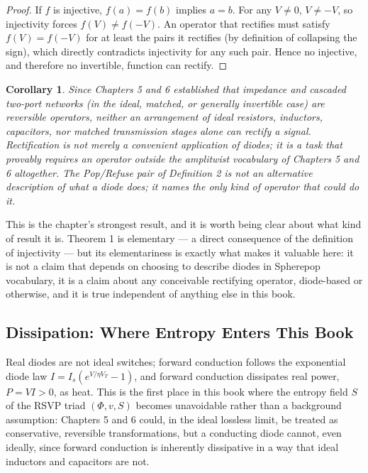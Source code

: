 \documentclass[12pt]{article}
\newtheorem{corollary}{Corollary}
\begin{document}
\begin{proof}
If $f$ is injective, $f(a) = f(b)$ implies $a = b$. For any $V \neq 0$, $V \neq -V$, so injectivity forces $f(V) \neq f(-V)$. An operator that rectifies must satisfy $f(V) = f(-V)$ for at least the pairs it rectifies (by definition of collapsing the sign), which directly contradicts injectivity for any such pair. Hence no injective, and therefore no invertible, function can rectify.
\end{proof}

\begin{corollary}
Since Chapters 5 and 6 established that impedance and cascaded two-port networks (in the ideal, matched, or generally invertible case) are reversible operators, neither an arrangement of ideal resistors, inductors, capacitors, nor matched transmission stages alone can rectify a signal. Rectification is not merely a convenient application of diodes; it is a task that provably requires an operator outside the amplitwist vocabulary of Chapters 5 and 6 altogether. The Pop/Refuse pair of Definition 2 is not an alternative description of what a diode does; it names the only kind of operator that could do it.
\end{corollary}

This is the chapter's strongest result, and it is worth being clear about what kind of result it is. Theorem 1 is elementary — a direct consequence of the definition of injectivity — but its elementariness is exactly what makes it valuable here: it is not a claim that depends on choosing to describe diodes in Spherepop vocabulary, it is a claim about any conceivable rectifying operator, diode-based or otherwise, and it is true independent of anything else in this book.

\subsection{Dissipation: Where Entropy Enters This Book}

Real diodes are not ideal switches; forward conduction follows the exponential diode law $I = I_s\left(e^{V/\eta V_T} - 1\right)$, and forward conduction dissipates real power, $P = VI > 0$, as heat. This is the first place in this book where the entropy field $S$ of the RSVP triad $(\Phi, v, S)$ becomes unavoidable rather than a background assumption: Chapters 5 and 6 could, in the ideal lossless limit, be treated as conservative, reversible transformations, but a conducting diode cannot, even ideally, since forward conduction is inherently dissipative in a way that ideal inductors and capacitors are not.
\end{document}
